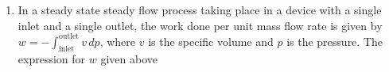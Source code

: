 \documentclass[journal]{IEEEtran}
\numberwithin{equation}{enumi}
\numberwithin{figure}{enumi}
\begin{document}
\begin{enumerate}




\begin{enumerate}
     
\end{enumerate}
\item In a steady state steady flow process taking place in a device with a single inlet and a single outlet, the work done per unit mass flow rate is given by $w = - \int_{\text{inlet}}^{\text{outlet}} v \, dp$, where $ v $ is the specific volume and $ p $ is the pressure. The expression for $ w $ given above
\hfill{}
\begin{enumerate}
 

\end{enumerate}
\end{enumerate}
\end{document}
